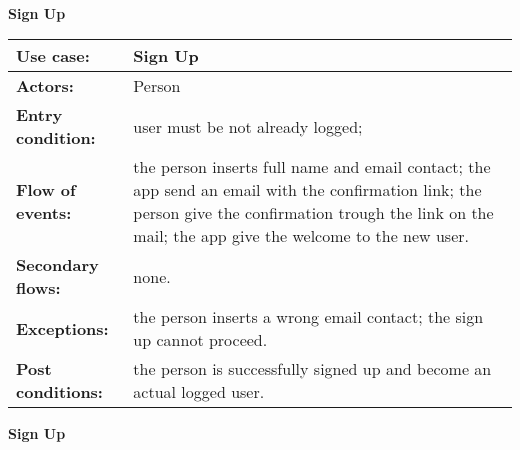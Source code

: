 			\\
		\textbf{Sign Up}
			\begin{table}[h!]
			\begin{tabu} to \textwidth {| X[\fcWidth,r,p] | X[1-\fcWidth,l,p] |}
				\hline\textbf{Use case:} & Sign Up
				\\
				\hline\textbf{Actors:} & Person
				\\
				\hline\textbf{Entry condition:} &user must be not already logged;
				\\
				\hline\textbf{Flow of events:} & the person inserts full name and email contact;\newline
				the app send an email with the confirmation link;\newline
				the person give the confirmation trough the link on the mail;\newline
				the app give the welcome to the new user.
				
				\\
				\hline\textbf{Secondary flows:} & none.
				\\
				\hline\textbf{Exceptions:} &the person inserts a wrong email contact;\newline
				the sign up cannot proceed.
				
				\\
				\hline\textbf{Post conditions:} & the person is successfully signed up and become an actual logged user.
				\\
				\hline
			\end{tabu}
		\end{table}
			\textbf{Sign Up}
